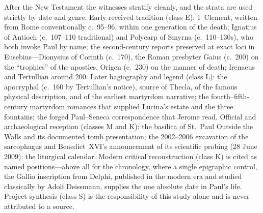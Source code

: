 After the New Testament the witnesses stratify cleanly, and the strata are
used strictly by date and genre. Early received tradition (class E):
1~Clement, written from Rome conventionally c.~95--96, within one
generation of the death; Ignatius of Antioch (c.~107--110 traditional) and
Polycarp of Smyrna (c.~110--130s), who both invoke Paul by name; the
second-century reports preserved at exact loci in Eusebius---Dionysius of
Corinth (c.~170), the Roman presbyter Gaius (c.~200) on the ``trophies'' of
the apostles, Origen (c.~230) on the manner of death; Irenaeus and
Tertullian around 200. Later hagiography and legend (class L): the
apocryphal  (c.~160 by Tertullian's notice), source of
Thecla, of the famous physical description, and of the earliest martyrdom
narrative; the fourth--fifth-century martyrdom romances that supplied
Lucina's estate and the three fountains; the forged Paul--Seneca
correspondence that Jerome read. Official and archaeological reception
(classes M and K): the basilica of St.~Paul Outside the Walls and its
documented tomb presentation; the 2002--2006 excavation of the sarcophagus
and Benedict~XVI's announcement of its scientific probing (28 June 2009);
the liturgical calendar. Modern critical reconstruction (class K) is cited
as named positions---above all for the chronology, where a single
epigraphic control, the Gallio inscription from Delphi, published in the
modern era and studied classically by Adolf Deissmann, supplies the one
absolute date in Paul's life. Project synthesis (class S) is the
responsibility of this study alone and is never attributed to a source.

